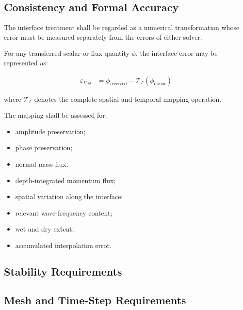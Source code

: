 \subsection{Consistency and Formal Accuracy}
\label{sec:res-num-ibc-consistency-formal-accuracy}


The interface treatment shall be regarded as a numerical transformation
whose error must be measured separately from the errors of either
solver.

For any transferred scalar or flux quantity $\phi$, the interface error
may be represented as:

\begin{align}
    \varepsilon_{\Gamma,\phi}
    &=
    \phi_{\mathrm{received}}
    -
    \mathcal{T}_{\Gamma}
    \left(
        \phi_{\mathrm{donor}}
    \right)
    \label{eq:res-num-ibc-interface-transfer-error}
\end{align}

where $\mathcal{T}_{\Gamma}$ denotes the complete spatial and temporal
mapping operation.

The mapping shall be assessed for:

\begin{itemize}
    \item amplitude preservation;
    \item phase preservation;
    \item normal mass flux;
    \item depth-integrated momentum flux;
    \item spatial variation along the interface;
    \item relevant wave-frequency content;
    \item wet and dry extent;
    \item accumulated interpolation error.
\end{itemize}

\subsection{Stability Requirements}
\label{sec:res-num-ibc-stability-requirements}


\subsection{Mesh and Time-Step Requirements}
\label{sec:res-num-ibc-mesh-time-step-requirements}

